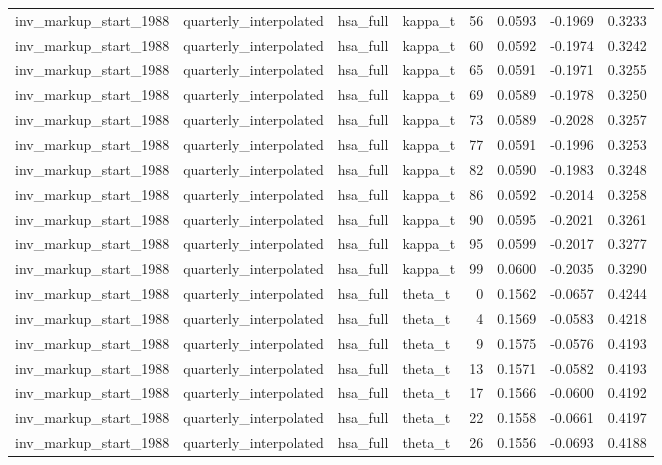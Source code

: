 \begin{tabular}{llllrrrr}
inv\_markup\_start\_1988 & quarterly\_interpolated & hsa\_full & kappa\_t & 56 & 0.0593 & -0.1969 & 0.3233 \\
inv\_markup\_start\_1988 & quarterly\_interpolated & hsa\_full & kappa\_t & 60 & 0.0592 & -0.1974 & 0.3242 \\
inv\_markup\_start\_1988 & quarterly\_interpolated & hsa\_full & kappa\_t & 65 & 0.0591 & -0.1971 & 0.3255 \\
inv\_markup\_start\_1988 & quarterly\_interpolated & hsa\_full & kappa\_t & 69 & 0.0589 & -0.1978 & 0.3250 \\
inv\_markup\_start\_1988 & quarterly\_interpolated & hsa\_full & kappa\_t & 73 & 0.0589 & -0.2028 & 0.3257 \\
inv\_markup\_start\_1988 & quarterly\_interpolated & hsa\_full & kappa\_t & 77 & 0.0591 & -0.1996 & 0.3253 \\
inv\_markup\_start\_1988 & quarterly\_interpolated & hsa\_full & kappa\_t & 82 & 0.0590 & -0.1983 & 0.3248 \\
inv\_markup\_start\_1988 & quarterly\_interpolated & hsa\_full & kappa\_t & 86 & 0.0592 & -0.2014 & 0.3258 \\
inv\_markup\_start\_1988 & quarterly\_interpolated & hsa\_full & kappa\_t & 90 & 0.0595 & -0.2021 & 0.3261 \\
inv\_markup\_start\_1988 & quarterly\_interpolated & hsa\_full & kappa\_t & 95 & 0.0599 & -0.2017 & 0.3277 \\
inv\_markup\_start\_1988 & quarterly\_interpolated & hsa\_full & kappa\_t & 99 & 0.0600 & -0.2035 & 0.3290 \\
inv\_markup\_start\_1988 & quarterly\_interpolated & hsa\_full & theta\_t & 0 & 0.1562 & -0.0657 & 0.4244 \\
inv\_markup\_start\_1988 & quarterly\_interpolated & hsa\_full & theta\_t & 4 & 0.1569 & -0.0583 & 0.4218 \\
inv\_markup\_start\_1988 & quarterly\_interpolated & hsa\_full & theta\_t & 9 & 0.1575 & -0.0576 & 0.4193 \\
inv\_markup\_start\_1988 & quarterly\_interpolated & hsa\_full & theta\_t & 13 & 0.1571 & -0.0582 & 0.4193 \\
inv\_markup\_start\_1988 & quarterly\_interpolated & hsa\_full & theta\_t & 17 & 0.1566 & -0.0600 & 0.4192 \\
inv\_markup\_start\_1988 & quarterly\_interpolated & hsa\_full & theta\_t & 22 & 0.1558 & -0.0661 & 0.4197 \\
inv\_markup\_start\_1988 & quarterly\_interpolated & hsa\_full & theta\_t & 26 & 0.1556 & -0.0693 & 0.4188 \\

\end{tabular}
